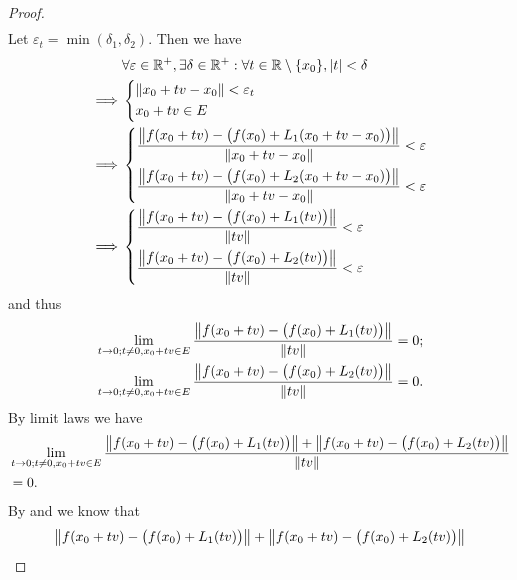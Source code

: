 \begin{proof}
\begin{align*}
  \end{align*}
  Let \(\varepsilon_t = \min(\delta_1, \delta_2)\).
  Then we have
  \begin{align*}
             & \forall \varepsilon \in \R^+, \exists \delta \in \R^+ : \forall t \in \R \setminus \set{x_0}, \abs{t} < \delta \\
    \implies & \begin{dcases}
                 \norm*{x_0 + tv - x_0} < \varepsilon_t \\
                 x_0 + tv \in E
               \end{dcases}                                                                         \\
    \implies & \begin{dcases}
                 \dfrac{\norm*{f(x_0 + tv) - \big(f(x_0) + L_1(x_0 + tv - x_0)\big)}}{\norm*{x_0 + tv - x_0}} < \varepsilon \\
                 \dfrac{\norm*{f(x_0 + tv) - \big(f(x_0) + L_2(x_0 + tv - x_0)\big)}}{\norm*{x_0 + tv - x_0}} < \varepsilon
               \end{dcases}                                     \\
    \implies & \begin{dcases}
                 \dfrac{\norm*{f(x_0 + tv) - \big(f(x_0) + L_1(tv)\big)}}{\norm*{tv}} < \varepsilon \\
                 \dfrac{\norm*{f(x_0 + tv) - \big(f(x_0) + L_2(tv)\big)}}{\norm*{tv}} < \varepsilon
               \end{dcases}
  \end{align*}
  and thus
  \begin{align*}
     & \lim_{t \to 0 ; t \neq 0, x_0 + tv \in E} \dfrac{\norm*{f(x_0 + tv) - \big(f(x_0) + L_1(tv)\big)}}{\norm*{tv}} = 0; \\
     & \lim_{t \to 0 ; t \neq 0, x_0 + tv \in E} \dfrac{\norm*{f(x_0 + tv) - \big(f(x_0) + L_2(tv)\big)}}{\norm*{tv}} = 0.
  \end{align*}
  By limit laws we have
  \begin{align*}
     & \lim_{t \to 0 ; t \neq 0, x_0 + tv \in E} \dfrac{\norm*{f(x_0 + tv) - \big(f(x_0) + L_1(tv)\big)} + \norm*{f(x_0 + tv) - \big(f(x_0) + L_2(tv)\big)}}{\norm*{tv}} \\
     & = 0.
  \end{align*}
  By  and  we know that
  \begin{align*}
     & \norm*{f(x_0 + tv) - \big(f(x_0) + L_1(tv)\big)} + \norm*{f(x_0 + tv) - \big(f(x_0) + L_2(tv)\big)}   \\

\end{align*}
\end{proof}
